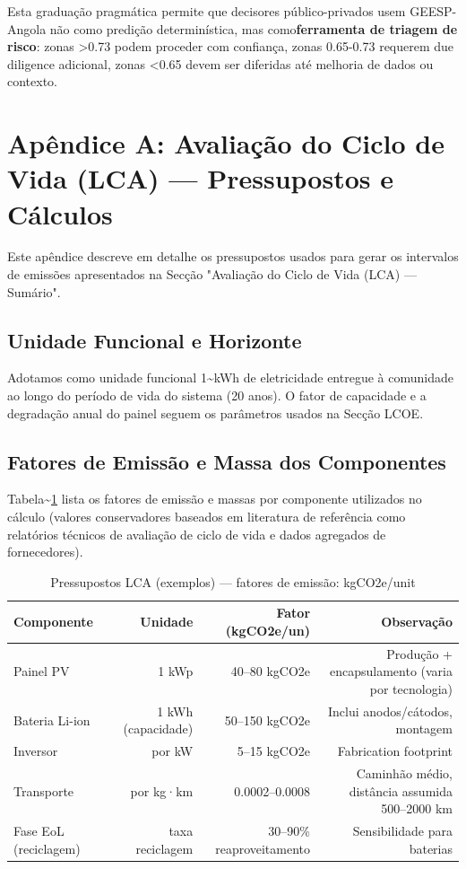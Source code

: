 \documentclass[12pt, a4paper]{article}
\begin{document}
Esta graduação pragmática permite que decisores público-privados usem GEESP-Angola não como predição determinística, mas como\textbf{ferramenta de triagem de risco}: zonas >0.73 podem proceder com confiança, zonas 0.65-0.73 requerem due diligence adicional, zonas <0.65 devem ser diferidas até melhoria de dados ou contexto.

\clearpage
\appendix
\section{Apêndice A: Avaliação do Ciclo de Vida (LCA) — Pressupostos e Cálculos}
\label{app:lca}

Este apêndice descreve em detalhe os pressupostos usados para gerar os intervalos de
emissões apresentados na Secção "Avaliação do Ciclo de Vida (LCA) — Sumário".

\subsection{Unidade Funcional e Horizonte}
Adotamos como unidade funcional 1\textasciitilde{}kWh de eletricidade entregue à comunidade ao longo do
período de vida do sistema (20 anos). O fator de capacidade e a degradação anual do painel
seguem os parâmetros usados na Secção LCOE.

\subsection{Fatores de Emissão e Massa dos Componentes}
Tabela\textasciitilde{}\ref{tab:lca_assumptions} lista os fatores de emissão e massas por componente
utilizados no cálculo (valores conservadores baseados em literatura de referência como
relatórios técnicos de avaliação de ciclo de vida e dados agregados de fornecedores).

\begin{table}[H]
\centering
\caption{Pressupostos LCA (exemplos) — fatores de emissão: kgCO2e/unit}
\label{tab:lca_assumptions}
\footnotesize
\begin{tabular}{@{}lrrr@{}}
\toprule
\rowcolor{LightBlue}\textbf{Componente} & \textbf{Unidade} & \textbf{Fator (kgCO2e/un)} & \textbf{Observação} \\
\midrule
Painel PV & 1 kWp & 40--80 kgCO2e & Produção + encapsulamento (varia por tecnologia) \\
Bateria Li-ion & 1 kWh (capacidade) & 50--150 kgCO2e & Inclui anodos/cátodos, montagem \\
Inversor & por kW & 5--15 kgCO2e & Fabrication footprint \\
Transporte & por kg·km & 0.0002--0.0008 & Caminhão médio, distância assumida 500--2000 km \\
Fase EoL (reciclagem) & taxa reciclagem & 30--90\% reaproveitamento & Sensibilidade para baterias \\
\bottomrule
\end{tabular}
\end{table}
\end{document}
